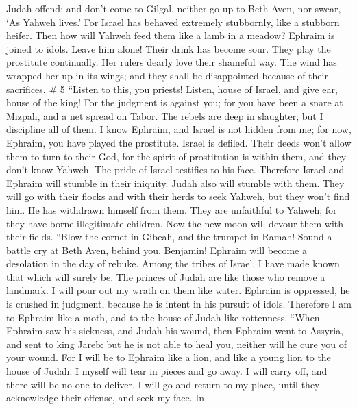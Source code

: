 Judah offend; and don't come to Gilgal, neither go up to Beth Aven, nor
swear, `As Yahweh lives.'  For Israel has behaved
extremely stubbornly, like a stubborn heifer. Then how will Yahweh feed
them like a lamb in a meadow?  Ephraim is joined to
idols. Leave him alone!  Their drink has become sour.
They play the prostitute continually. Her rulers dearly love their
shameful way.  The wind has wrapped her up in its wings;
and they shall be disappointed because of their sacrifices. \# 5
 ``Listen to this, you priests! Listen, house of Israel,
and give ear, house of the king! For the judgment is against you; for
you have been a snare at Mizpah, and a net spread on Tabor.
 The rebels are deep in slaughter, but I discipline all of
them.  I know Ephraim, and Israel is not hidden from me;
for now, Ephraim, you have played the prostitute. Israel is defiled.
 Their deeds won't allow them to turn to their God, for
the spirit of prostitution is within them, and they don't know Yahweh.
 The pride of Israel testifies to his face. Therefore
Israel and Ephraim will stumble in their iniquity. Judah also will
stumble with them.  They will go with their flocks and
with their herds to seek Yahweh, but they won't find him. He has
withdrawn himself from them.  They are unfaithful to
Yahweh; for they have borne illegitimate children. Now the new moon will
devour them with their fields.  ``Blow the cornet in
Gibeah, and the trumpet in Ramah! Sound a battle cry at Beth Aven,
behind you, Benjamin!  Ephraim will become a desolation in
the day of rebuke. Among the tribes of Israel, I have made known that
which will surely be.  The princes of Judah are like
those who remove a landmark. I will pour out my wrath on them like
water.  Ephraim is oppressed, he is crushed in judgment,
because he is intent in his pursuit of idols.  Therefore
I am to Ephraim like a moth, and to the house of Judah like rottenness.
 ``When Ephraim saw his sickness, and Judah his wound,
then Ephraim went to Assyria, and sent to king Jareb: but he is not able
to heal you, neither will he cure you of your wound.  For
I will be to Ephraim like a lion, and like a young lion to the house of
Judah. I myself will tear in pieces and go away. I will carry off, and
there will be no one to deliver.  I will go and return to
my place, until they acknowledge their offense, and seek my face. In

